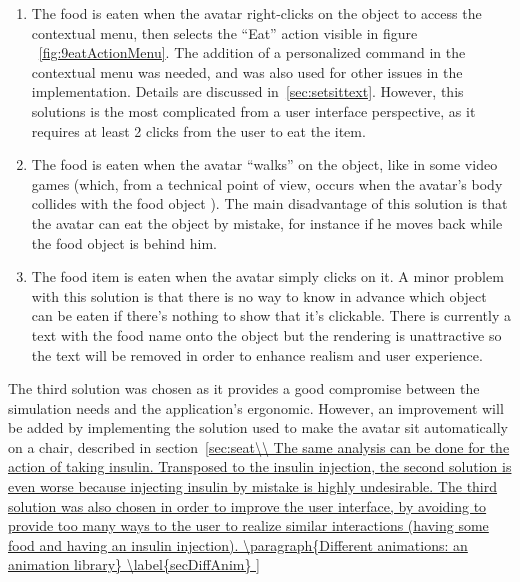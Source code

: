 \begin{itemize}
\begin{itemize}
\begin{enumerate}
\item The food is eaten when the avatar right-clicks on the object to access the contextual menu, then selects the ``Eat'' action visible in figure ~\ref{fig:9eatActionMenu}. The addition of a personalized command in the contextual menu was needed, and was also used for other issues in the implementation. Details are discussed in~\ref{sec:setsittext}. However, this solutions is the most complicated from a user interface perspective, as it requires at least 2 clicks from the user to eat the item.
\item The food is eaten when the avatar ``walks'' on the object, like in some video games (which, from a technical point of view, occurs when the avatar's body collides with the food object ). The main disadvantage of this solution is that the avatar can eat the object by mistake, for instance if he moves back while the food object is behind him.
\item The food item is eaten when the avatar simply clicks on it. A minor problem with this solution is that there is no way to know in advance which object can be eaten if there's nothing to show that it's clickable. There is currently a text with the food name onto the object but the rendering is unattractive so the text will be removed in order to enhance realism and user experience.
\end{enumerate}

The third solution was chosen as it provides a good compromise between the simulation needs and the application's ergonomic. However, an improvement will be added by implementing the solution used to make the avatar sit automatically on a chair, described in section~\ref{sec:seat\\

The same analysis can be done for the action of taking insulin. Transposed to the insulin injection, the second solution is even worse 
because injecting insulin by mistake is highly undesirable. 
The third solution was also
chosen in order to improve the user interface, 
by avoiding to provide too many ways to the user to realize 
similar interactions (having some food and having an insulin injection). 

	\paragraph{Different animations: an animation library}
\label{secDiffAnim}

}
\end{itemize}
\end{itemize}
